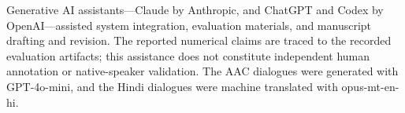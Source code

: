 Generative AI assistants---Claude by Anthropic, and ChatGPT and Codex by OpenAI---assisted system integration, evaluation materials, and manuscript drafting and revision.
The reported numerical claims are traced to the recorded evaluation artifacts; this assistance does not constitute independent human annotation or native-speaker validation.
The AAC dialogues were generated with GPT-4o-mini, and the Hindi dialogues were machine translated with opus-mt-en-hi.
